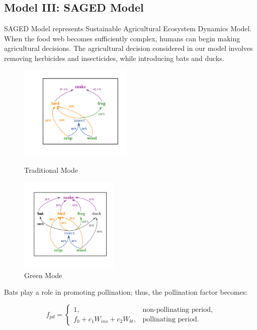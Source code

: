 \documentclass{HZNUMCM}
\begin{document}
    \subsection{Model III: SAGED Model}
      SAGED Model represents Sustainable Agricultural Ecosystem Dynamics Model.
      When the food web becomes sufficiently complex, 
      humans can begin making agricultural decisions. 
      The agricultural decision considered in our model involves removing herbicides and insecticides, 
      while introducing bats and ducks.
      \begin{figure}[H]
        \begin{minipage}[b]{0.45\linewidth}
          \centering
          \includegraphics[height=4.5cm, keepaspectratio]{images/food_web_chem.pdf}
          \caption{Traditional Mode}
          \label{fig:food_web_chem}
        \end{minipage}
        \hspace{0\linewidth}
        \begin{minipage}[b]{0.45\linewidth}
            \centering
            \includegraphics[height=4.5cm, keepaspectratio]{images/food_web.pdf} %
            \caption{Green Mode}
            \label{fig:food_web_green}
        \end{minipage}
      \end{figure}
      Bats play a role in promoting pollination; thus, the pollination factor becomes:
      
      \[
      f_{pd} = \begin{cases}
      1, & \text{non-pollinating period}, \\
      f_0 + c_1 W_{ins} + c_2 W_{bt}, & \text{pollinating period}.
      \end{cases}
      \]
      
\end{document}
